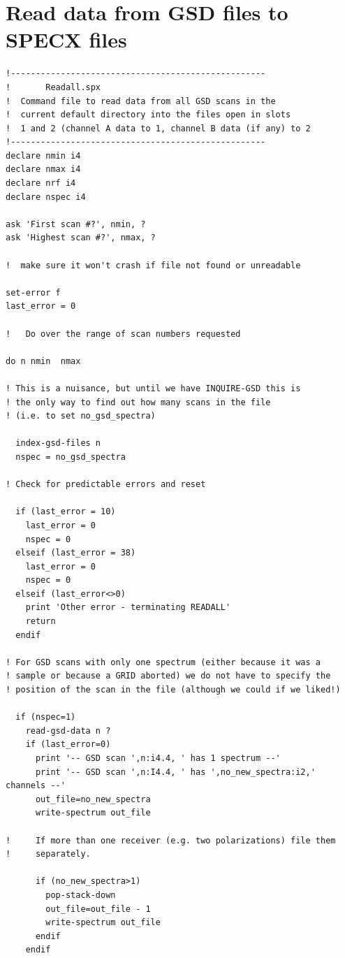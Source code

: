 \documentclass[11pt,twoside]{report}
\begin{document}
\newpage
\section{Read data from GSD files to SPECX files}

\begin{verbatim}
!---------------------------------------------------
!       Readall.spx
!  Command file to read data from all GSD scans in the
!  current default directory into the files open in slots
!  1 and 2 (channel A data to 1, channel B data (if any) to 2
!---------------------------------------------------
declare nmin i4
declare nmax i4
declare nrf i4
declare nspec i4

ask 'First scan #?', nmin, ?
ask 'Highest scan #?', nmax, ?

!  make sure it won't crash if file not found or unreadable

set-error f
last_error = 0

!   Do over the range of scan numbers requested

do n nmin  nmax

! This is a nuisance, but until we have INQUIRE-GSD this is
! the only way to find out how many scans in the file
! (i.e. to set no_gsd_spectra)

  index-gsd-files n
  nspec = no_gsd_spectra

! Check for predictable errors and reset

  if (last_error = 10)
    last_error = 0
    nspec = 0
  elseif (last_error = 38)
    last_error = 0
    nspec = 0
  elseif (last_error<>0)
    print 'Other error - terminating READALL'
    return
  endif

! For GSD scans with only one spectrum (either because it was a
! sample or because a GRID aborted) we do not have to specify the
! position of the scan in the file (although we could if we liked!)

  if (nspec=1)
    read-gsd-data n ?
    if (last_error=0)
      print '-- GSD scan ',n:i4.4, ' has 1 spectrum --'
      print '-- GSD scan ',n:I4.4, ' has ',no_new_spectra:i2,' channels --'
      out_file=no_new_spectra
      write-spectrum out_file

!     If more than one receiver (e.g. two polarizations) file them
!     separately.

      if (no_new_spectra>1)
        pop-stack-down
        out_file=out_file - 1
        write-spectrum out_file
      endif
    endif


\end{verbatim}
\end{document}
